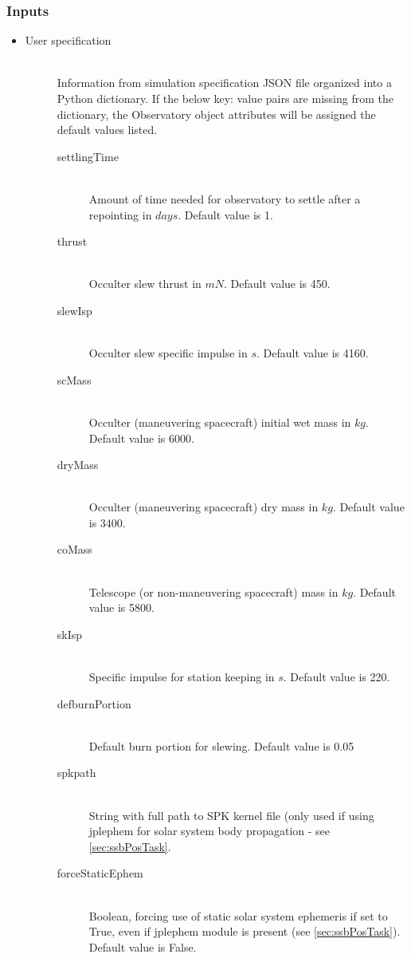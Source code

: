 \documentclass[cleanfoot]{asme2ej}
\begin{document}
\subsubsection*{Inputs}
\begin{itemize}
    \item
    \begin{description}
        \item[User specification] \hfill \\
        Information from simulation specification JSON file organized into a Python dictionary. If the below key: value pairs are missing from the dictionary, the Observatory object attributes will be assigned the default values listed.
        \begin{description}
            \item[settlingTime] \hfill \\
            Amount of time needed for observatory to settle after a repointing in $ days $. Default value is 1.
            \item[thrust] \hfill \\
            Occulter slew thrust in $ mN $. Default value is 450.
            \item[slewIsp] \hfill \\
            Occulter slew specific impulse in $ s $. Default value is 4160.
            \item[scMass] \hfill \\
            Occulter (maneuvering spacecraft) initial wet mass in $ kg $. Default value is 6000.
            \item[dryMass] \hfill \\
            Occulter (maneuvering spacecraft) dry mass in $ kg $. Default value is 3400.
            \item[coMass] \hfill \\
            Telescope (or non-maneuvering spacecraft) mass in $ kg $. Default value is 5800.
            \item[skIsp] \hfill \\
            Specific impulse for station keeping in $ s $. Default value is 220.
            \item[defburnPortion] \hfill \\
            Default burn portion for slewing. Default value is 0.05
            \item[spkpath] \hfill\\
            String with full path to SPK kernel file (only used if using jplephem for solar system body propagation - see \ref{sec:ssbPosTask}.
            \item[forceStaticEphem] \hfill \\
            Boolean, forcing use of static solar system ephemeris if set to True, even if jplephem module is present (see \ref{sec:ssbPosTask}).  Default value is False.
        \end{description}
    \end{description}
\end{itemize}
\end{document}
